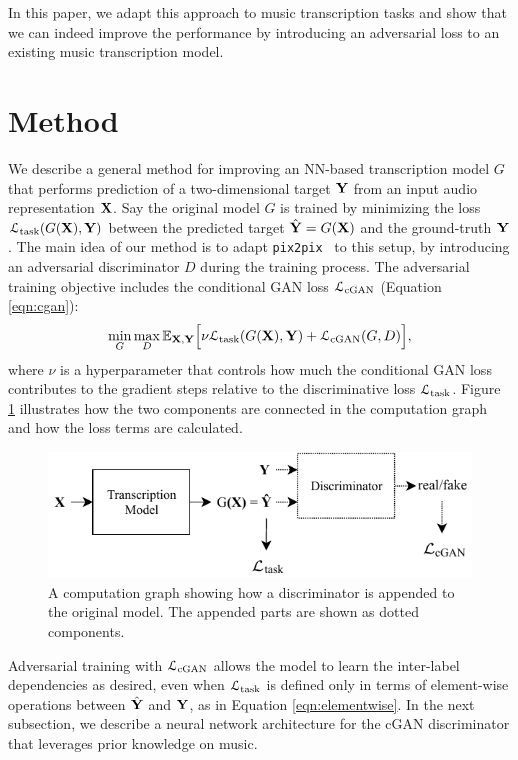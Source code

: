 In this paper, we adapt this approach to music transcription tasks and show that we can indeed improve the performance by introducing an adversarial loss to an existing music transcription model.



\section{Method}

We describe a general method for improving an NN-based transcription model $G$ that performs prediction of a two-dimensional target $\mathbf{Y}$ from an input audio representation $\mathbf{X}$.
Say the original model $G$ is trained by minimizing the loss $\mathcal{L}_{\textrm{task}}(G(\mathbf{X}), \mathbf{Y})$ between the predicted target $\hat{\mathbf{Y}} = G(\mathbf{X})$ and the ground-truth $\mathbf{Y}$. 
The main idea of our method is to adapt \texttt{pix2pix}~\cite{isola2017pix2pix} to this setup, by introducing an adversarial discriminator $D$ during the training process.
The adversarial training objective includes the conditional GAN loss $\mathcal{L}_{\text{cGAN}}$ (Equation \ref{eqn:cgan}):
\begin{equation}
\min_{G}\max_{D} \mathbb{E}_{\mathbf{X},\mathbf{Y}} \Big [ \nu\mathcal{L}_{\text{task}} (G(\mathbf{X}), \mathbf{Y}) + \mathcal{L}_{\text{cGAN}}(G, D) \Big ],
\end{equation}
where $\nu$ is a hyperparameter that controls how much the conditional GAN loss contributes to the gradient steps relative to the discriminative loss $\mathcal{L}_{\text{task}}$.
Figure \ref{fig:discriminator} illustrates how the two components are connected in the computation graph and how the loss terms are calculated.

\begin{figure}[t]
	\centering\includegraphics[width=0.8\columnwidth]{discriminator.pdf}
	\caption{A computation graph showing how a discriminator is appended to the original model. The appended parts are shown as dotted components.}\label{fig:discriminator}
\end{figure}

Adversarial training with $\mathcal{L}_{\text{cGAN}}$ allows the model to learn the inter-label dependencies as desired, even when $\mathcal{L}_{\text{task}}$ is defined only in terms of element-wise operations between $\hat{\mathbf{Y}}$ and $\mathbf{Y}$, as in Equation \ref{eqn:elementwise}.
In the next subsection, we describe a neural network architecture for the  cGAN discriminator that leverages prior knowledge on music.


